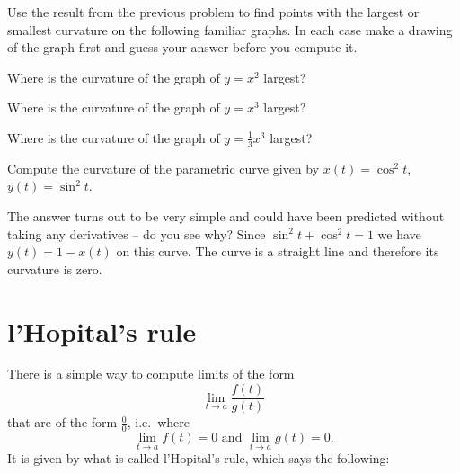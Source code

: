 \begin{multicols}{2}
\problem Use the result from the previous problem to find points with the %
largest or smallest curvature on the following familiar graphs.  In each case
make a drawing of the graph first and guess your answer before you compute it.




\subprob Where is the curvature of the graph of $y=x^2$ largest?




\subprob Where is the curvature of the graph of $y=x^3$ largest?




\subprob Where is the curvature of the graph of $y=\frac13x^3$ largest?




\problem \carefulnow  Compute the curvature of the parametric curve given by %
$x(t) = \cos^2 t$, $y(t) = \sin^2 t$.




The answer turns out to be very simple and could have been predicted without
taking any derivatives -- do you see why?
\answer %
Since $\sin^2t + \cos^2 t =1$ we have $y(t) = 1-x(t)$ on this curve.  The curve
is a straight line and therefore its curvature is zero.
\endanswer




















\end{multicols}
\noproblemfont




\section{l'Hopital's rule} %
\label{sec:05lhopitals-rule}




There is a simple way to compute limits of the form
\[
\lim_{t\to a} \frac{f(t)} {g(t)}
\]
that are of the form $\frac{0} {0}$, i.e.~where
\[
\lim_{t\to a} f(t) = 0
\text{ and }
\lim_{t\to a} g(t) = 0.
\]
It is given by what is called l'Hopital's rule, which says the
following:




